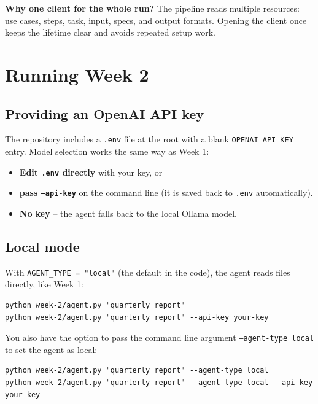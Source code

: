 \documentclass[12pt, a4paper]{article}
\begin{document}
\begin{notebox}
\textbf{Why one client for the whole run?} The pipeline reads multiple resources: use cases, steps, task, input, specs, and output formats. Opening the client once keeps the lifetime clear and avoids repeated setup work.
\end{notebox}

\section{Running Week 2}

\subsection{Providing an OpenAI API key}

The repository includes a \texttt{.env} file at the root with a blank \texttt{OPENAI\_API\_KEY} entry. Model selection works the same way as Week 1:

\begin{itemize}[leftmargin=1.5em]
  \item \textbf{Edit \texttt{.env} directly} with your key, or
  \item \textbf{pass \texttt{--api-key}} on the command line (it is saved back to \texttt{.env} automatically).
  \item \textbf{No key} -- the agent falls back to the local Ollama model.
\end{itemize}

\subsection{Local mode}

With \texttt{AGENT\_TYPE = "local"} (the default in the code), the agent reads files directly, like Week 1:

\begin{lstlisting}[style=shellstyle]
python week-2/agent.py "quarterly report"
python week-2/agent.py "quarterly report" --api-key your-key
\end{lstlisting}

You also have the option to pass the command line argument \texttt{--agent-type local} to set the agent as local:

\begin{lstlisting}[style=shellstyle]
python week-2/agent.py "quarterly report" --agent-type local
python week-2/agent.py "quarterly report" --agent-type local --api-key your-key
\end{lstlisting}
\end{document}
